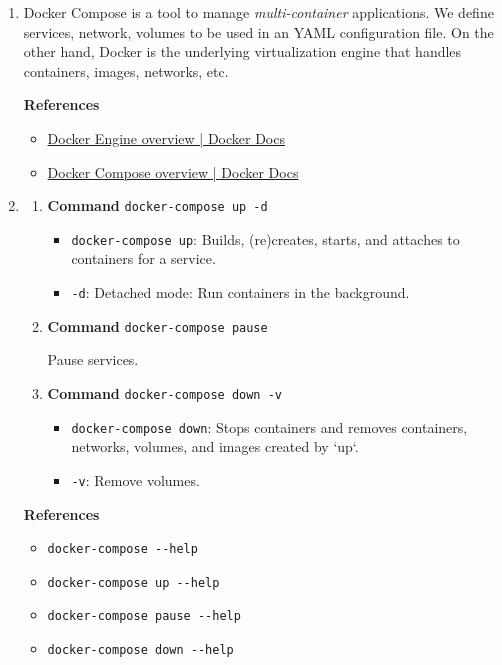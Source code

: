 \documentclass[12pt, a4paper]{article}
\begin{document}
\begin{enumerate}[resume]
    \item Docker Compose is a tool to manage \textit{multi-container} applications.
    We define services, network, volumes to be used in an YAML configuration file.
    On the other hand, Docker is the underlying virtualization engine that
    handles containers, images, networks, etc.

    \textbf{References}
    \begin{itemize}
      \item \href{https://docs.docker.com/engine/}{Docker Engine overview | Docker Docs}
      \item \href{https://docs.docker.com/compose/}{Docker Compose overview | Docker Docs}
    \end{itemize}

    \item
    \begin{enumerate}
      \item \textbf{Command} \verb|docker-compose up -d|
      \begin{itemize}
        \item \verb|docker-compose up|: Builds, (re)creates, starts, and attaches to containers for a service.
        \item \verb|-d|: Detached mode: Run containers in the background.
      \end{itemize}

      \item \textbf{Command} \verb|docker-compose pause|

      Pause services.

      \item \textbf{Command} \verb|docker-compose down -v|
      \begin{itemize}
        \item \verb|docker-compose down|: Stops containers and removes containers, networks, volumes, and images created by `up`.
        \item \verb|-v|: Remove volumes.
      \end{itemize}

    \end{enumerate}

    \textbf{References}
    \begin{itemize}
      \item \verb|docker-compose --help|
      \item \verb|docker-compose up --help|
      \item \verb|docker-compose pause --help|
      \item \verb|docker-compose down --help|
    \end{itemize}
  \end{enumerate}
\end{document}

